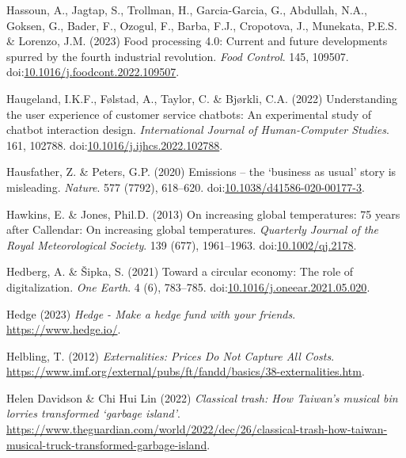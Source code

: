 \documentclass[
  letterpaper,
  DIV=11,
  numbers=noendperiod]{scrartcl}
\newlength{\cslhangindent}
\newenvironment{CSLReferences}[2] %
 {\begin{list}{}{%
  \setlength{\itemindent}{0pt}
  \setlength{\leftmargin}{0pt}
  \setlength{\parsep}{0pt}
  \ifodd #1
   \setlength{\leftmargin}{\cslhangindent}
   \setlength{\itemindent}{-1\cslhangindent}
  \fi
  \setlength{\itemsep}{#2\baselineskip}}}
 {\end{list}}
\begin{document}
\begin{CSLReferences}{0}{1}
Hassoun, A., Jagtap, S., Trollman, H., Garcia-Garcia, G., Abdullah,
N.A., Goksen, G., Bader, F., Ozogul, F., Barba, F.J., Cropotova, J.,
Munekata, P.E.S. \& Lorenzo, J.M. (2023) Food processing 4.0: {Current}
and future developments spurred by the fourth industrial revolution.
\emph{Food Control}. 145, 109507.
doi:\href{https://doi.org/10.1016/j.foodcont.2022.109507}{10.1016/j.foodcont.2022.109507}.

Haugeland, I.K.F., Følstad, A., Taylor, C. \& Bjørkli, C.A. (2022)
Understanding the user experience of customer service chatbots: {An}
experimental study of chatbot interaction design. \emph{International
Journal of Human-Computer Studies}. 161, 102788.
doi:\href{https://doi.org/10.1016/j.ijhcs.2022.102788}{10.1016/j.ijhcs.2022.102788}.

Hausfather, Z. \& Peters, G.P. (2020) Emissions -- the {`business as
usual'} story is misleading. \emph{Nature}. 577 (7792), 618--620.
doi:\href{https://doi.org/10.1038/d41586-020-00177-3}{10.1038/d41586-020-00177-3}.

Hawkins, E. \& Jones, Phil.D. (2013) On increasing global temperatures:
75 years after {Callendar}: {On} increasing global temperatures.
\emph{Quarterly Journal of the Royal Meteorological Society}. 139 (677),
1961--1963. doi:\href{https://doi.org/10.1002/qj.2178}{10.1002/qj.2178}.

Hedberg, A. \& Šipka, S. (2021) Toward a circular economy: {The} role of
digitalization. \emph{One Earth}. 4 (6), 783--785.
doi:\href{https://doi.org/10.1016/j.oneear.2021.05.020}{10.1016/j.oneear.2021.05.020}.

Hedge (2023) \emph{Hedge - {Make} a hedge fund with your friends}.
\url{https://www.hedge.io/}.

Helbling, T. (2012) \emph{Externalities: {Prices Do Not Capture All
Costs}}.
\url{https://www.imf.org/external/pubs/ft/fandd/basics/38-externalities.htm}.

Helen Davidson \& Chi Hui Lin (2022) \emph{Classical trash: How
{Taiwan}'s musical bin lorries transformed {`garbage island'}}.
\url{https://www.theguardian.com/world/2022/dec/26/classical-trash-how-taiwan-musical-truck-transformed-garbage-island}.


\end{CSLReferences}
\end{document}

